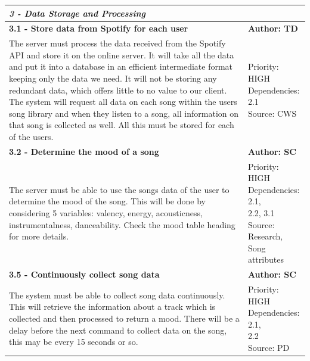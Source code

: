 \documentclass[10pt, notitlepage]{report}
\begin{document}
\begin{center}
\begin{longtable}{| p{13cm} | p{3cm} |}
\multicolumn{2}{|l|}{\textbf{\textit{3 - Data Storage and Processing}}} \\
\hline
\textbf{3.1 - Store data from Spotify for each user} & \textbf{Author: TD} \\
\hline
The server must process the data received from the Spotify API and store it on the online server. It will take all the data and put it into a database in an efficient intermediate format keeping only the data we need. It will not be storing any redundant data, which offers little to no value to our client. The system will request all data on each song within the users song library and when they listen to a song, all information on that song is collected as well. All this must be stored for each of the users. &
\makecell{Priority: HIGH\\Dependencies: 2.1\\Source: CWS} \\
\hline
\textbf{3.2 - Determine the mood of a song} & \textbf{Author: SC} \\
\hline
The server must be able to use the songs data of the user to determine the mood of the song. This will be done by considering 5 variables: valency, energy, acousticness, instrumentalness, danceability. Check the mood table heading for more details. & 
\makecell{Priority: HIGH\\Dependencies: 2.1,\\2.2, 3.1\\Source: Research,\\ Song attributes}\\
\hline
\textbf{3.5 - Continuously collect song data} & \textbf{Author: SC} \\
\hline
The system must be able to collect song data continuously. This will retrieve the information about a track which is collected and then processed to return a mood. There will be a delay before the next command to collect data on the song, this may be every 15 seconds or so. & 
\makecell{Priority: HIGH\\Dependencies: 2.1,\\2.2\\Source: PD}\\
\hline



\end{longtable}
\end{center}
\end{document}
